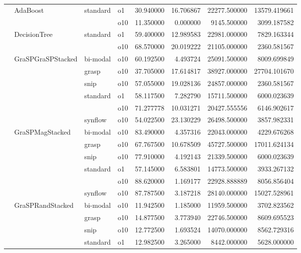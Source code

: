 \begin{longtable}{llllrrrr}
\bottomrule
\endlastfoot
0.004 & AdaBoost & standard & o1 &  30.940000 &  16.706867 &     22277.500000 &  13579.419661 \\
      &     &         & o10 &  11.350000 &   0.000000 &      9145.500000 &   3099.187582 \\
      & DecisionTree & standard & o1 &  59.400000 &  12.989583 &     22981.000000 &   7829.163344 \\
      &     &         & o10 &  68.570000 &  20.019222 &     21105.000000 &   2360.581567 \\
      & GraSPGraSPStacked & bi-modal & o10 &  60.192500 &   4.493724 &     25091.500000 &   8009.699849 \\
      &     & grasp & o10 &  37.705000 &  17.614817 &     38927.000000 &  27704.101670 \\
      &     & snip & o10 &  57.055000 &  19.028136 &     24857.000000 &   2360.581567 \\
      &     & standard & o1 &  58.117500 &   7.282790 &     15711.500000 &   6000.023639 \\
      &     &         & o10 &  71.277778 &  10.031271 &     20427.555556 &   6146.902617 \\
      &     & synflow & o10 &  54.022500 &  23.130229 &     26498.500000 &   3857.982331 \\
      & GraSPMagStacked & bi-modal & o10 &  83.490000 &   4.357316 &     22043.000000 &   4229.676268 \\
      &     & grasp & o10 &  67.767500 &  10.678509 &     45727.500000 &  17011.624134 \\
      &     & snip & o10 &  77.910000 &   4.192143 &     21339.500000 &   6000.023639 \\
      &     & standard & o1 &  57.145000 &   6.583801 &     14773.500000 &   3933.267132 \\
      &     &         & o10 &  88.620000 &   1.169177 &     22928.888889 &   8056.856404 \\
      &     & synflow & o10 &  87.787500 &   3.187218 &     28140.000000 &  15027.528961 \\
      & GraSPRandStacked & bi-modal & o10 &  11.942500 &   1.185000 &     11959.500000 &   3702.823562 \\
      &     & grasp & o10 &  14.877500 &   3.773940 &     22746.500000 &   8609.695523 \\
      &     & snip & o10 &  12.772500 &   1.693524 &     14070.000000 &   8562.729316 \\
      &     & standard & o1 &  12.982500 &   3.265000 &      8442.000000 &   5628.000000 \\

\end{longtable}
